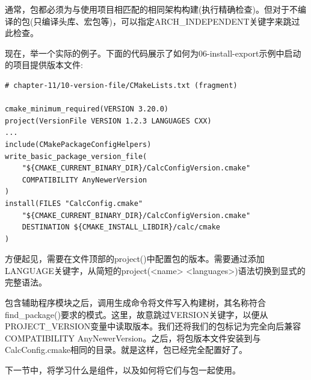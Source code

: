 通常，包都必须为与使用项目相匹配的相同架构构建(执行精确检查)。但对于不编译的包(只编译头库、宏包等)，可以指定ARCH\_INDEPENDENT关键字来跳过此检查。

现在，举一个实际的例子。下面的代码展示了如何为06-install-export示例中启动的项目提供版本文件:

\begin{lstlisting}[style=styleCMake]
# chapter-11/10-version-file/CMakeLists.txt (fragment)

cmake_minimum_required(VERSION 3.20.0)
project(VersionFile VERSION 1.2.3 LANGUAGES CXX)
...
include(CMakePackageConfigHelpers)
write_basic_package_version_file(
	"${CMAKE_CURRENT_BINARY_DIR}/CalcConfigVersion.cmake"
	COMPATIBILITY AnyNewerVersion
)
install(FILES "CalcConfig.cmake"
	"${CMAKE_CURRENT_BINARY_DIR}/CalcConfigVersion.cmake"
	DESTINATION ${CMAKE_INSTALL_LIBDIR}/calc/cmake
)
\end{lstlisting}

方便起见，需要在文件顶部的project()中配置包的版本。需要通过添加LANGUAGE关键字，从简短的project(<name> <languages>)语法切换到显式的完整语法。

包含辅助程序模块之后，调用生成命令将文件写入构建树，其名称符合find\_package()要求的模式。这里，故意跳过VERSION关键字，以便从PROJECT\_VERSION变量中读取版本。我们还将我们的包标记为完全向后兼容COMPATIBILITY AnyNewerVersion。之后，将包版本文件安装到与CalcConfig.cmake相同的目录。就是这样，包已经完全配置好了。

下一节中，将学习什么是组件，以及如何将它们与包一起使用。







